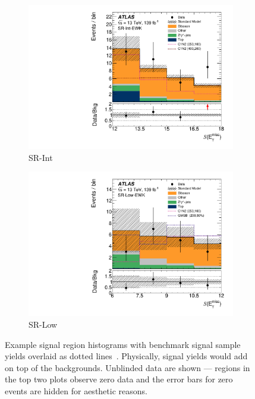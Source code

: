 \begin{figure}[tp]
\begin{subfigure}{0.48\textwidth}
\includegraphics[width=\textwidth]{figures/2ljets_sr_int_met_sig.pdf}
\caption{SR-Int}
\end{subfigure}
\hfill
\begin{subfigure}{0.48\textwidth}
\centering
\includegraphics[width=\textwidth]{figures/2ljets_sr_low_met_sig.pdf}
\caption{SR-Low}
\end{subfigure}
\caption[
Example signal region histograms with benchmark signal sample yields overlaid
]{%
Example signal region histograms with benchmark signal sample yields overlaid
as dotted lines~\cite{atlas2022searches}.
Physically, signal yields would add on top of the backgrounds.
Unblinded data are shown --- regions in the top two plots observe zero data
and the error bars for zero events are hidden for aesthetic reasons.%
}
\label{fig:2ljets_signal_examples}
\end{figure}

